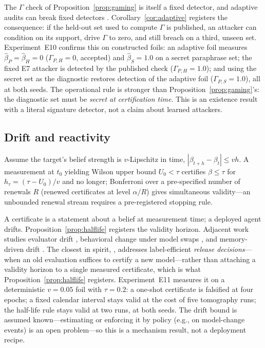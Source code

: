 The $\Gamma$ check of Proposition~\ref{prop:gaming} is itself a fixed
detector, and adaptive audits can break fixed detectors
\cite{soopal2026,duddu2026}. Corollary~\ref{cor:adaptive} registers the
consequence: if the held-out set used to compute $\Gamma$ is published, an
attacker can condition on its support, drive $\Gamma$ to zero, and still
breach on a third, unseen set. Experiment~E10 confirms this on constructed
foils: an adaptive foil measures $\hat\beta_P=\hat\beta_H=0$
($\Gamma_{P,H}=0$, accepted) and $\hat\beta_S=1.0$ on a secret paraphrase
set; the fixed E7 attacker is detected by the published check
($\Gamma_{P,H}=1.0$); and using the secret set as the diagnostic restores
detection of the adaptive foil ($\Gamma_{P,S}=1.0$), all at both seeds. The
operational rule is stronger than Proposition~\ref{prop:gaming}'s: the
diagnostic set must be \emph{secret at certification time}. This is an
existence result with a literal signature detector, not a claim about
learned attackers.

\subsection{Drift and reactivity}\label{sec:drift}

\begin{proposition}\label{prop:halflife}
Assume the target's belief strength is $v$-Lipschitz in time,
$|\beta_{t+h}-\beta_t|\le vh$. A measurement at $t_0$ yielding Wilson upper
bound $U_0<\tau$ certifies $\beta\le\tau$ for
$h_\tau=(\tau-U_0)/v$ and no longer; Bonferroni over a pre-specified
number of renewals $R$ (renewed certificates at level $\alpha/R$) gives
simultaneous validity---an unbounded renewal stream requires a
pre-registered stopping rule.
\end{proposition}

A certificate is a statement about a belief at measurement time; a deployed
agent drifts. Proposition~\ref{prop:halflife} registers the validity
horizon. Adjacent work studies evaluator drift \cite{evaldrift2026},
behavioral change under model swaps \cite{modeltransition2026}, and
memory-driven drift \cite{memevo2026}. The closest in spirit,
\cite{evaldrift2026}, addresses label-efficient \emph{release
decisions}---when an old evaluation suffices to certify a new model---rather
than attaching a validity horizon to a single measured certificate, which is
what Proposition~\ref{prop:halflife} registers. Experiment~E11 measures it on a deterministic $v=0.05$
foil with $\tau=0.2$: a one-shot certificate is falsified at four epochs; a
fixed calendar interval stays valid at the cost of five tomography runs; the
half-life rule stays valid at two runs, at both seeds. The drift bound is
assumed known---estimating or enforcing it by policy (e.g., on model-change
events) is an open problem---so this is a mechanism result, not a deployment
recipe.

